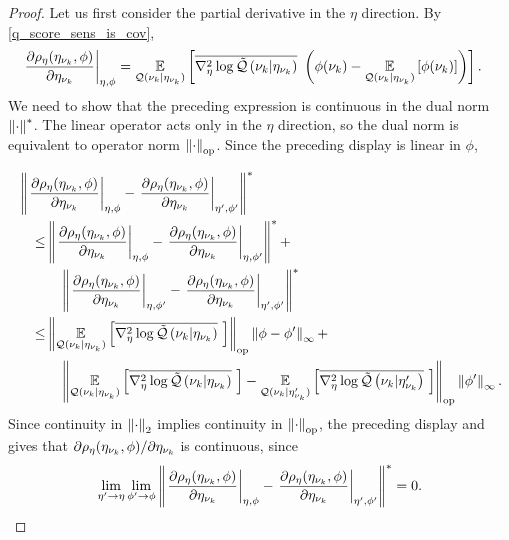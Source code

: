 \begin{lem}
\begin{proof}
Let us first consider the partial derivative in the $\eta$ direction. By
 \eqref{q_score_sens_is_cov},
%
\begin{align*}
%
\fracat{\partial \rho_\eta(\etanuk, \phi)}{\partial \etanuk}{\eta, \phi} ={}&
\expect{\q(\nuk \vert \etanuk)}{
   \lqhessbar{\nuk \vert \etanuk}
       \left(
        \phi(\nuk) - \expect{\q(\nuk \vert \etanuk)}{\phi(\nuk)}
       \right)
       }.
%
\end{align*}
%
We need to show that the preceding expression is continuous in the dual norm
$\left\Vert\cdot\right\Vert^*$.  The linear operator acts only in the $\eta$ direction, so
the dual norm is equivalent to operator norm $\left\Vert\cdot\right\Vert_{\mathrm{op}}$.  Since
the preceding display is linear in $\phi$,

%
\begin{align*}
%
\MoveEqLeft
%
\norm{\fracat{\partial \rho_\eta(\etanuk, \phi)}{\partial \etanuk}{\eta, \phi} -
      \fracat{\partial \rho_\eta(\etanuk, \phi)}{\partial \etanuk}{\eta', \phi'}
      }^* \\ \le
%
& \norm{\fracat{\partial \rho_\eta(\etanuk, \phi)}{\partial \etanuk}{\eta, \phi} -
        \fracat{\partial \rho_\eta(\etanuk, \phi)}{\partial \etanuk}{\eta, \phi'}
    }^* + \\&\quad
\norm{\fracat{\partial \rho_\eta(\etanuk, \phi)}{\partial \etanuk}{\eta, \phi'} -
      \fracat{\partial \rho_\eta(\etanuk, \phi)}{\partial \etanuk}{\eta', \phi'}
    }^* \\ \le
%
& \normop{
    \expect{\q(\nuk \vert \etanuk)}
           {\lqhessbar{\nuk \vert \etanuk}}
    } \norminf{\phi - \phi'} + \\&\quad
\normop{
    \expect{\q(\nuk \vert \etanuk)}{\lqhessbar{\nuk \vert \etanuk}} -
    \expect{\q(\nuk \vert \etanuk')}{\lqhessbar{\nuk \vert \etanuk'}}
  } \norminf{\phi'}.
%
\end{align*}
%
Since continuity in $\left\Vert\cdot\right\Vert_2$ implies continuity in $\left\Vert\cdot\right\Vert_{\mathrm{op}}$,
the preceding display and  gives that
$\partial \rho_\eta(\eta_{\nu_{k}}, \phi) / \partial \eta_{\nu_{k}}$ is continuous,
since
%
\begin{align*}
%
\lim_{\eta' \rightarrow \eta} \lim_{\phi' \rightarrow \phi}
\norm{\fracat{\partial \rho_\eta(\etanuk, \phi)}{\partial \etanuk}{\eta, \phi} -
      \fracat{\partial \rho_\eta(\etanuk, \phi)}{\partial \etanuk}{\eta', \phi'}
      }^* = 0.
%
\end{align*}


\end{proof}
\end{lem}
